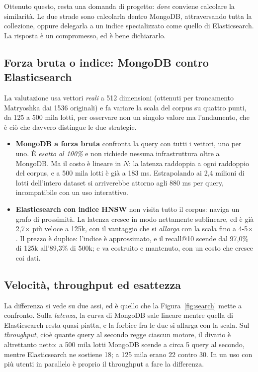 \documentclass[11pt,a4paper]{article}
\begin{document}
Ottenuto questo, resta una domanda di progetto: \emph{dove} conviene calcolare la similarità.
Le due strade sono calcolarla dentro MongoDB, attraversando tutta la collezione, oppure
delegarla a un indice specializzato come quello di Elasticsearch. La risposta è un compromesso,
ed è bene dichiararlo.

\subsection{Forza bruta o indice: MongoDB contro Elasticsearch}

La valutazione usa vettori \emph{reali} a 512 dimensioni (ottenuti per troncamento Matryoshka
dai 1536 originali) e fa variare la scala del corpus su quattro punti, da 125 a 500 mila lotti,
per osservare non un singolo valore ma l'andamento, che è ciò che davvero distingue le due
strategie.

\begin{itemize}
  \item \textbf{MongoDB a forza bruta} confronta la query con tutti i vettori, uno per uno. È
        \emph{esatto al 100\%} e non richiede nessuna infrastruttura oltre a MongoDB. Ma il
        costo è lineare in $N$: la latenza raddoppia a ogni raddoppio del corpus, e a 500 mila
        lotti è già a 183 ms. Estrapolando ai 2,4 milioni di lotti dell'intero dataset si
        arriverebbe attorno agli 880 ms per query, incompatibile con un uso interattivo.
  \item \textbf{Elasticsearch con indice HNSW} non visita tutto il corpus: naviga un grafo di
        prossimità. La latenza cresce in modo nettamente sublineare, ed è già 2,7$\times$ più
        veloce a 125k, con il vantaggio che si \emph{allarga} con la scala fino a 4-5$\times$.
        Il prezzo è duplice: l'indice è approssimato, e il recall@10 scende dal 97,0\% di 125k
        all'89,3\% di 500k; e va costruito e mantenuto, con un costo che cresce coi dati.
\end{itemize}

\subsection{Velocità, throughput ed esattezza}

La differenza si vede su due assi, ed è quello che la Figura~\ref{fig:search} mette a confronto.
Sulla \emph{latenza}, la curva di MongoDB sale lineare mentre quella di Elasticsearch resta
quasi piatta, e la forbice fra le due si allarga con la scala. Sul \emph{throughput}, cioè
quante query al secondo regge ciascun motore, il divario è altrettanto netto: a 500 mila lotti
MongoDB scende a circa 5 query al secondo, mentre Elasticsearch ne sostiene 18; a 125 mila erano
22 contro 30. In un uso con più utenti in parallelo è proprio il throughput a fare la
differenza.
\end{document}
